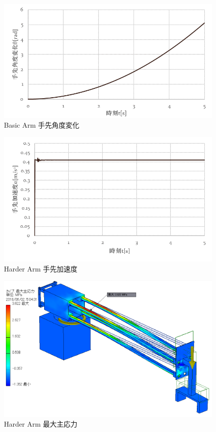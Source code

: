 \documentclass[10pt,b5paper,papersize,dvipdfmx]{jsbook}
\begin{document}
%
\begin{figure}[H]
  \centering
  \includegraphics[width=.8\textwidth]{img/robot16.png}
  \caption{Basic Arm 手先角度変化}
  \label{fig:Basic Arm 手先角度変化}
\end{figure}
%
\begin{figure}[H]
  \centering
  \includegraphics[width=.8\textwidth]{img/robot17.png}
  \caption{Harder Arm 手先加速度}
  \label{fig:Harder Arm 手先加速度}
\end{figure}
%
\begin{figure}[H]
  \centering
  \includegraphics[width=.65\textwidth]{img/robot18.png}
  \caption{Harder Arm 最大主応力}
  \label{fig:Harder Arm 最大主応力}
\end{figure}
\end{document}
